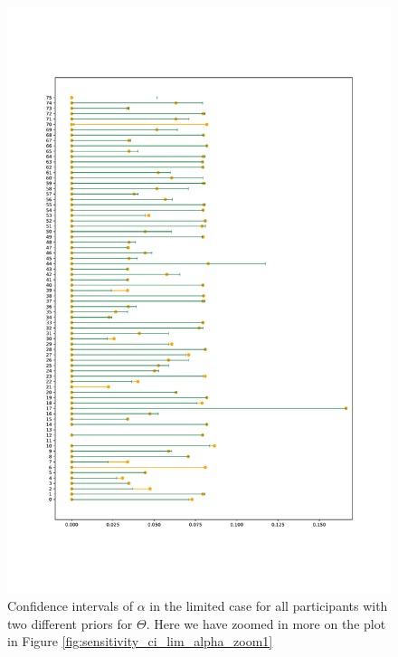 \begin{figure}
    \centering
    \includegraphics[scale=0.36]{pictures/Sensitivity/ci_lim_alpha_zoom2_pdf.pdf}
    \caption[CIs for $\alpha$ in the limited case, zoomed]{   Confidence intervals of $\alpha$ in the limited case for all participants with two different priors for $\Theta$. Here we have zoomed in more on the plot in Figure \ref{fig:sensitivity_ci_lim_alpha_zoom1}}
    \label{fig:sensitivity_cis_lim_alpha_zoom2}
\end{figure}

